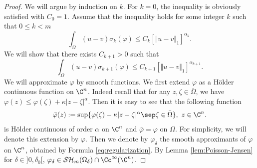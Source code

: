 \begin{proof}
We will argue by induction on $k$. For $k=0$, the inequality is obviously satisfied with $C_0 = 1$. Assume that the inequality holds for some integer $k$ such that $0 \leq k<m$ \ie
\begin{equation}\label{eq:Hyprec}
\int_{\Omega}( u-v) \sigma_k{(\varphi)}\leq C_{k} \left[\Vert u-v \Vert_1\right]^{\alpha_k}.
\end{equation}
We will show that there exists $C_{k+1} > 0$ such that
\[
\int_{\Omega}(u-v) \sigma_{k+1}(\varphi)\leq C_{k+1} \left[\Vert u-v \Vert_1\right]^{\alpha_{k+1}}.
\]
We will approximate $\varphi$ by smooth functions. We first extend $\varphi$ as a Hölder continuous function on $\C^n$. Indeed recall that for any $z, \zeta \in \bar{\Omega}$, we have $\varphi (z) \leq \varphi (\zeta) + \kappa \vert z - \zeta\vert^\alpha $. Then it is easy to see that the following function
\begin{equation} \label{eq:Holderextension}
\bar{\varphi} (z):= \sup \{\varphi (\zeta) - \kappa \vert z - \zeta\vert^\alpha \sep \zeta \in \bar{\Omega}\}, \, \, z \in \C^n.
\end{equation}
is Hölder continuous of order $\alpha$ on $\C^n$ and $ \bar{\varphi} = \varphi$ on $\Omega$. For simplicity, we will denote this extension by $\varphi$. Then we denote by $\varphi_{\delta}$ the smooth approximants of $\varphi $ on $\C^n$, obtained by Formula \eqref{eq:regularization}. By Lemma \ref{lem:Poisson-Jensen} for $\delta\in{}]0,\delta_0[$, $\varphi_\delta \in \mathcal{SH}_m (\Omega_{\delta})\cap\Cc^{\infty}(\C^n)$.


\end{proof}
